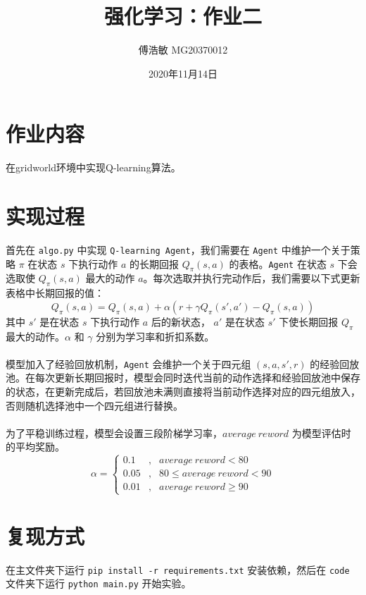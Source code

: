 \documentclass[a4paper,12pt]{article}
\begin{document}
\begin{CJK}{UTF8}{gbsn}

\title{强化学习：作业二}

\author{傅浩敏 MG20370012}

\date{2020年11月14日}

\maketitle

\section{作业内容}
在gridworld环境中实现Q-learning算法。

\section{实现过程}
首先在 \texttt{algo.py} 中实现 \texttt{Q-learning Agent}，我们需要在 \texttt{Agent} 中维护一个关于策略 $\pi$ 在状态 $s$ 下执行动作 $a$ 的长期回报 $Q_\pi(s,a)$ 的表格。\texttt{Agent} 在状态 $s$ 下会选取使 $Q_\pi(s,a)$ 最大的动作 $a$。每次选取并执行完动作后，我们需要以下式更新表格中长期回报的值：
$$Q_\pi(s,a)=Q_\pi(s,a)+\alpha(r+\gamma Q_\pi(s',a')-Q_\pi(s,a))$$
其中 $s'$ 是在状态 $s$ 下执行动作 $a$ 后的新状态， $a'$ 是在状态 $s'$ 下使长期回报 $Q_\pi$ 最大的动作。$\alpha$ 和 $\gamma$ 分别为学习率和折扣系数。\\\\
模型加入了经验回放机制，\texttt{Agent} 会维护一个关于四元组 $(s,a,s',r)$ 的经验回放池。在每次更新长期回报时，模型会同时迭代当前的动作选择和经验回放池中保存的状态，在更新完成后，若回放池未满则直接将当前动作选择对应的四元组放入，否则随机选择池中一个四元组进行替换。\\\\
为了平稳训练过程，模型会设置三段阶梯学习率，$average\ reword$ 为模型评估时的平均奖励。
$$\alpha=\left\{\begin{aligned}
0.1 &,& average\ reword<80 \\
0.05 &,& 80\leq average\ reword<90 \\
0.01 &,& average\ reword\geq 90
\end{aligned}\right.$$
\section{复现方式}
在主文件夹下运行 \texttt{pip install -r requirements.txt} 安装依赖，然后在 \texttt{code} 文件夹下运行 \texttt{python main.py} 开始实验。

\end{CJK}
\end{document}

